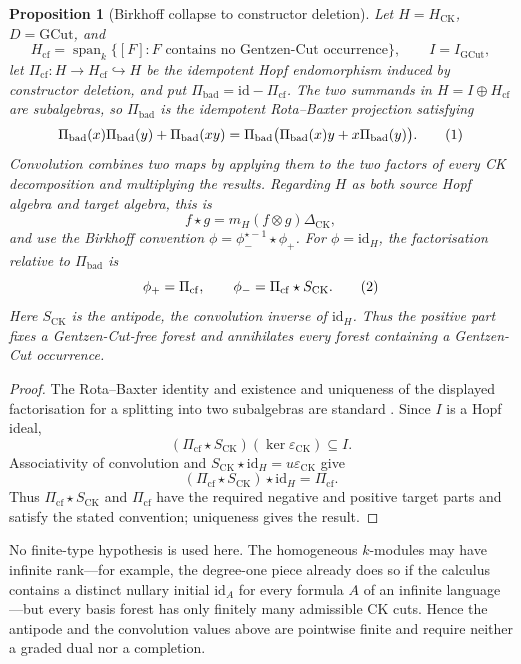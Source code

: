 \documentclass[10pt,a4paper]{article}
\theoremstyle{plain}
\newtheorem{proposition}[theorem]{Proposition}
\theoremstyle{definition}
\theoremstyle{remark}
\newcommand{\HCK}{H_{\mathrm{CK}}}
\newcommand{\DeltaCK}{\Delta_{\mathrm{CK}}}
\newcommand{\epsCK}{\varepsilon_{\mathrm{CK}}}
\newcommand{\eqtag}{\refstepcounter{equation}\tag{\theequation}}
\begin{document}
\begin{proposition}[Birkhoff collapse to constructor deletion]
\label{prop:birkhoff-constructor-deletion}
Let \(H=\HCK\), \(D=\mathrm{GCut}\), and
\[
 H_{\mathrm{cf}}
   =\operatorname{span}_k
      \{[F]:F\text{ contains no Gentzen-Cut occurrence}\},
 \qquad I=I_{\mathrm{GCut}},
\]
let \(\Pi_{\mathrm{cf}}:H\to H_{\mathrm{cf}}\hookrightarrow H\) be the
idempotent Hopf endomorphism induced by constructor deletion, and put
\(\Pi_{\mathrm{bad}}=\mathrm{id}-\Pi_{\mathrm{cf}}\).  The two summands in
\(
H=I\oplus H_{\mathrm{cf}}
\)
are subalgebras, so \(\Pi_{\mathrm{bad}}\) is the idempotent Rota--Baxter projection
satisfying
\[
 \Pi_{\mathrm{bad}}(x)\Pi_{\mathrm{bad}}(y)+\Pi_{\mathrm{bad}}(xy)
 =\Pi_{\mathrm{bad}}\bigl(\Pi_{\mathrm{bad}}(x)y
       +x\Pi_{\mathrm{bad}}(y)\bigr).
\eqtag\label{eq:rota-baxter-convention}
\]
Convolution combines two maps by applying them to the two factors of every
CK decomposition and multiplying the results.  Regarding \(H\) as both
source Hopf algebra and target algebra, this is
\[
        f\star g=m_H(f\otimes g)\DeltaCK,
\]
and use the Birkhoff convention
\(
\phi=\phi_-^{\star-1}\star\phi_+
\).
For \(\phi=\mathrm{id}_H\), the factorisation relative to
\(\Pi_{\mathrm{bad}}\) is
\[
 \phi_+=\Pi_{\mathrm{cf}},\qquad
 \phi_-=\Pi_{\mathrm{cf}}\star S_{\mathrm{CK}} .
\eqtag\label{eq:birkhoff-is-deletion}
\]
Here \(S_{\mathrm{CK}}\) is the antipode, the convolution inverse of
\(\mathrm{id}_H\).
Thus the positive part fixes a Gentzen-Cut-free forest and annihilates
every forest containing a Gentzen-Cut occurrence.
\end{proposition}

\begin{proof}
The Rota--Baxter identity and existence and uniqueness of the displayed
factorisation for a splitting into two subalgebras are standard
\cite{ebrahimifardguokreimer2004}.  Since \(I\) is a Hopf ideal,
\[
      (\Pi_{\mathrm{cf}}\star S_{\mathrm{CK}})(\ker\epsCK)\subseteq I.
\]
Associativity of convolution and
\(
S_{\mathrm{CK}}\star\mathrm{id}_H=u\epsCK
\)
give
\[
 (\Pi_{\mathrm{cf}}\star S_{\mathrm{CK}})\star\mathrm{id}_H
   =\Pi_{\mathrm{cf}}.
\]
Thus \(\Pi_{\mathrm{cf}}\star S_{\mathrm{CK}}\) and
\(\Pi_{\mathrm{cf}}\) have the required negative and positive target
parts and satisfy the stated convention; uniqueness gives the result.
\end{proof}

No finite-type hypothesis is used here.  The homogeneous \(k\)-modules
may have infinite rank---for example, the degree-one piece already does so
if the calculus contains a distinct nullary initial \(\mathrm{id}_A\) for
every formula \(A\) of an infinite language---but every basis forest has
only finitely many admissible CK cuts.  Hence the antipode and the
convolution values above are pointwise finite and require neither a graded
dual nor a completion.
\end{document}
